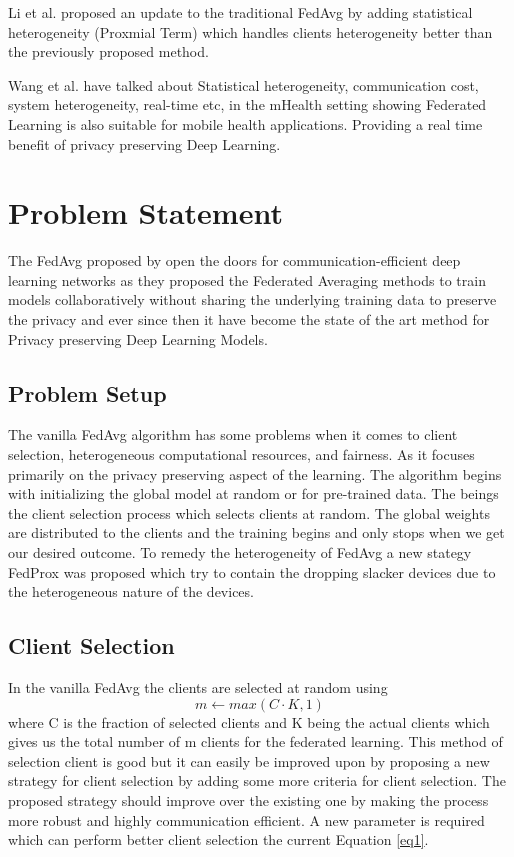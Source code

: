 \documentclass[conference]{IEEEtran}
\begin{document}
\par Li et al. \cite{li2020federated} proposed an update to the traditional FedAvg by adding statistical heterogeneity (Proxmial Term) which handles clients heterogeneity better than the previously proposed method.  \par Wang et al. \cite{wang2023applications} have talked about Statistical heterogeneity, communication cost, system heterogeneity, real-time etc, in the mHealth setting showing Federated Learning is also suitable for mobile health applications. Providing a real time benefit of privacy preserving Deep Learning. 

\section{Problem Statement}
The FedAvg proposed by \cite{mcmahan2017communication} open the doors for communication-efficient deep learning networks as they proposed the Federated Averaging methods to train models collaboratively without sharing the underlying training data to preserve the privacy and ever since then it have become the state of the art method for Privacy preserving Deep Learning Models. 
\subsection{Problem Setup} 
The vanilla FedAvg algorithm has some problems when it comes to client selection, heterogeneous computational resources, and fairness. As it focuses primarily on the privacy preserving aspect of the learning. The algorithm begins with initializing the global model at random or for pre-trained data. The beings the client selection process which selects clients at random. The global weights are distributed to the clients and the training begins and only stops when we get our desired outcome. To remedy the heterogeneity of FedAvg a new stategy FedProx \cite{li2020federated} was proposed which try to contain the dropping slacker devices due to the heterogeneous nature of the devices.

\subsection{Client Selection}

In the vanilla FedAvg the clients are selected at random using 
\begin{equation}
 m \gets max(C\cdot K,1)
 \label{eq1}
 \end{equation}
 where C is the fraction of selected clients and K being the actual clients which gives us the total number of m clients for the federated learning. This method of selection client is good but it can easily be improved upon by proposing a new strategy for client selection by adding some more criteria for client selection. The proposed strategy should improve over the existing one by making the process more robust and highly communication efficient. A new parameter is required which can perform better client selection the current Equation \ref{eq1}.   
\end{document}
